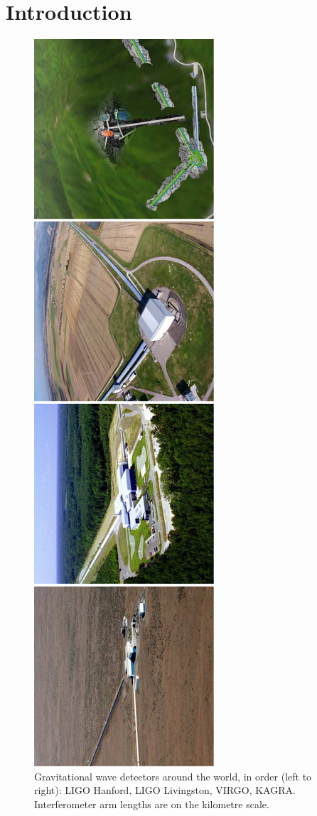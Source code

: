 \documentclass[aps,pra,superscriptaddress,reprint,nofootinbib]{revtex4-1}
\begin{document}
\maketitle

\section{Introduction}
\label{sec:introduction}

\begin{figure}
	\begin{center}
	\includegraphics[height=\textwidth,angle=-90]{figures/gwo_ifos-pictures.pdf}
	\end{center}
	\caption{Gravitational wave detectors around the world, in order (left to right): LIGO Hanford, LIGO Livingston, VIRGO, KAGRA. Interferometer arm lengths are on the kilometre scale.}
	\label{fig:gw_ifos}
\end{figure}
\end{document}
